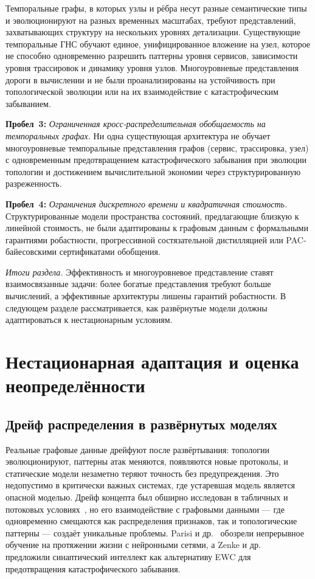 Темпоральные графы, в которых узлы и рёбра несут разные семантические типы и эволюционируют на разных временных масштабах, требуют представлений, захватывающих структуру на нескольких уровнях детализации. Существующие темпоральные ГНС обучают единое, унифицированное вложение на узел, которое не способно одновременно разрешить паттерны уровня сервисов, зависимости уровня трассировок и динамику уровня узлов. Многоуровневые представления дороги в вычислении и не были проанализированы на устойчивость при топологической эволюции или на их взаимодействие с катастрофическим забыванием.

\medskip
\noindent\textbf{Пробел~3:} \emph{Ограниченная кросс-распределительная обобщаемость на темпоральных графах.} Ни одна существующая архитектура не обучает многоуровневые темпоральные представления графов (сервис, трассировка, узел) с одновременным предотвращением катастрофического забывания при эволюции топологии и достижением вычислительной экономии через структурированную разреженность.

\medskip
\noindent\textbf{Пробел~4:} \emph{Ограничения дискретного времени и квадратичная стоимость.} Структурированные модели пространства состояний, предлагающие близкую к линейной стоимость, не были адаптированы к графовым данным с формальными гарантиями робастности, прогрессивной состязательной дистилляцией или PAC-байесовскими сертификатами обобщения.

\medskip
\noindent\textit{Итоги раздела.} Эффективность и многоуровневое представление ставят взаимосвязанные задачи: более богатые представления требуют больше вычислений, а эффективные архитектуры лишены гарантий робастности. В следующем разделе рассматривается, как развёрнутые модели должны адаптироваться к нестационарным условиям.


\section{Нестационарная адаптация и оценка неопределённости}
\label{sec:nonstationarity}

\subsection{Дрейф распределения в развёрнутых моделях}

Реальные графовые данные дрейфуют после развёртывания: топологии эволюционируют, паттерны атак меняются, появляются новые протоколы, и статические модели незаметно теряют точность без предупреждения. Это недопустимо в критически важных системах, где устаревшая модель является опасной моделью. Дрейф концепта был обширно исследован в табличных и потоковых условиях~\cite{Gama2014,Lu2019}, но его взаимодействие с графовыми данными --- где одновременно смещаются как распределения признаков, так и топологические паттерны --- создаёт уникальные проблемы. Parisi и др.~\cite{Parisi2019} обозрели непрерывное обучение на протяжении жизни с нейронными сетями, а Zenke и др.~\cite{Zenke2017,Wilson2020} предложили синаптический интеллект как альтернативу EWC для предотвращения катастрофического забывания.


